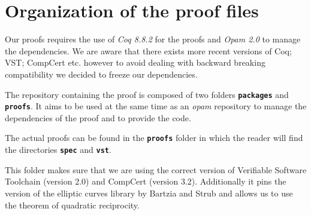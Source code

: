 \section{Organization of the proof files}
\label{appendix:proof-folders}

Our proofs requires the use of \emph{Coq 8.8.2} for the proofs and
\emph{Opam 2.0} to manage the dependencies. We are aware that there exists more
recent versions of Coq; VST; CompCert etc. however to avoid dealing with backward
breaking compatibility we decided to freeze our dependencies.

The repository containing the proof is composed of two folders \textbf{\texttt{packages}}
and \textbf{\texttt{proofs}}.
It aims to be used at the same time as an \emph{opam} repository to manage
the dependencies of the proof and to provide the code.

The actual proofs can be found in the \textbf{\texttt{proofs}} folder in which
the reader will find the directories \textbf{\texttt{spec}} and \textbf{\texttt{vst}}.

This folder makes sure that we are using the correct version of
Verifiable Software Toolchain (version 2.0) and CompCert (version 3.2).
Additionally it pins the version of the elliptic curves library by Bartzia and Strub
and allows us to use the theorem of quadratic reciprocity.

